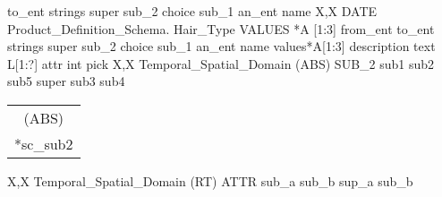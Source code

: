 \documentclass[11pt]{article}
\def\twolines#1#2{\vbox{\hbox{#1} \hbox{#2}}}
\renewcommand{\twolines}[2]{\begin{tabular}{c} #1\\{} #2\end{tabular}}
\begin{document}
to\_ent
\stopmpxshipout
\mpxshipout%
strings
\stopmpxshipout
\mpxshipout%
super
\stopmpxshipout
\mpxshipout%
sub\_2
\stopmpxshipout
\mpxshipout%
choice
\stopmpxshipout
\mpxshipout%
sub\_1
\stopmpxshipout
\mpxshipout%
an\_ent
\stopmpxshipout
\mpxshipout%
name
\stopmpxshipout
\mpxshipout%
X,X DATE
\stopmpxshipout
\mpxshipout%
Product\_Definition\_Schema.
\stopmpxshipout
\mpxshipout%
Hair\_Type
\stopmpxshipout
\mpxshipout%
VALUES *A [1:3]
\stopmpxshipout
\mpxshipout%
from\_ent
\stopmpxshipout
\mpxshipout%
to\_ent
\stopmpxshipout
\mpxshipout%
strings
\stopmpxshipout
\mpxshipout%
super
\stopmpxshipout
\mpxshipout%
sub\_2
\stopmpxshipout
\mpxshipout%
choice
\stopmpxshipout
\mpxshipout%
sub\_1
\stopmpxshipout
\mpxshipout%
an\_ent
\stopmpxshipout
\mpxshipout%
name
\stopmpxshipout
\mpxshipout%
values*A[1:3]
\stopmpxshipout
\mpxshipout%
description
\stopmpxshipout
\mpxshipout%
text
\stopmpxshipout
\mpxshipout%
L[1:?]
\stopmpxshipout
\mpxshipout%
attr
\stopmpxshipout
\mpxshipout%
int
\stopmpxshipout
\mpxshipout%
pick
\stopmpxshipout
\mpxshipout%
X,X Temporal\_Spatial\_Domain
\stopmpxshipout
\mpxshipout%
(ABS) SUB\_2
\stopmpxshipout
\mpxshipout%
sub1
\stopmpxshipout
\mpxshipout%
sub2
\stopmpxshipout
\mpxshipout%
sub5
\stopmpxshipout
\mpxshipout%
super
\stopmpxshipout
\mpxshipout%
sub3
\stopmpxshipout
\mpxshipout%
sub4
\stopmpxshipout
\mpxshipout%
\twolines{(ABS)}{*sc\_sub2}
\stopmpxshipout
{}
\stopmpxshipout
\mpxshipout%
X,X Temporal\_Spatial\_Domain
\stopmpxshipout
\mpxshipout%
(RT) ATTR
\stopmpxshipout
\mpxshipout%
sub\_a
\stopmpxshipout
\mpxshipout%
sub\_b
\stopmpxshipout
\mpxshipout%
sup\_a
\stopmpxshipout
\mpxshipout%
sub\_b
\stopmpxshipout
\mpxshipout%
\end{document}
